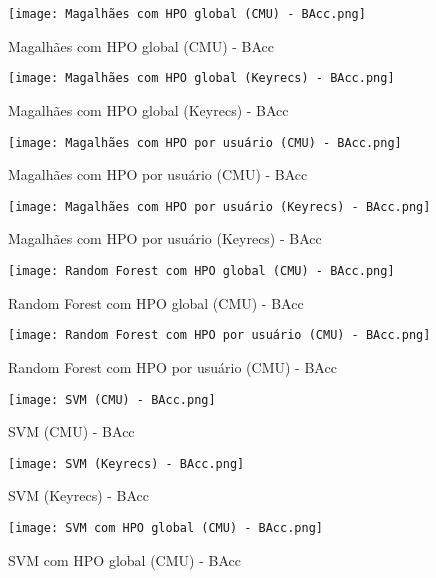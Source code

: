 \begin{figure}[H]
    \caption{Magalhães com HPO global (CMU) - BAcc}\label{fig:Magalhães com HPO global (CMU) - BAcc}
    \centering
    \texttt{[image: Magalhães com HPO global (CMU) - BAcc.png]}
\end{figure}
\begin{figure}[H]
    \caption{Magalhães com HPO global (Keyrecs) - BAcc}\label{fig:Magalhães com HPO global (Keyrecs) - BAcc}
    \centering
    \texttt{[image: Magalhães com HPO global (Keyrecs) - BAcc.png]}
\end{figure}
\begin{figure}[H]
    \caption{Magalhães com HPO por usuário (CMU) - BAcc}\label{fig:Magalhães com HPO por usuário (CMU) - BAcc}
    \centering
    \texttt{[image: Magalhães com HPO por usuário (CMU) - BAcc.png]}
\end{figure}
\begin{figure}[H]
    \caption{Magalhães com HPO por usuário (Keyrecs) - BAcc}\label{fig:Magalhães com HPO por usuário (Keyrecs) - BAcc}
    \centering
    \texttt{[image: Magalhães com HPO por usuário (Keyrecs) - BAcc.png]}
\end{figure}
\begin{figure}[H]
    \caption{Random Forest com HPO global (CMU) - BAcc}\label{fig:Random Forest com HPO global (CMU) - BAcc}
    \centering
    \texttt{[image: Random Forest com HPO global (CMU) - BAcc.png]}
\end{figure}
\begin{figure}[H]
    \caption{Random Forest com HPO por usuário (CMU) - BAcc}\label{fig:Random Forest com HPO por usuário (CMU) - BAcc}
    \centering
    \texttt{[image: Random Forest com HPO por usuário (CMU) - BAcc.png]}
\end{figure}
\begin{figure}[H]
    \caption{SVM (CMU) - BAcc}\label{fig:SVM (CMU) - BAcc}
    \centering
    \texttt{[image: SVM (CMU) - BAcc.png]}
\end{figure}
\begin{figure}[H]
    \caption{SVM (Keyrecs) - BAcc}\label{fig:SVM (Keyrecs) - BAcc}
    \centering
    \texttt{[image: SVM (Keyrecs) - BAcc.png]}
\end{figure}
\begin{figure}[H]
    \caption{SVM com HPO global (CMU) - BAcc}\label{fig:SVM com HPO global (CMU) - BAcc}
    \centering
    \texttt{[image: SVM com HPO global (CMU) - BAcc.png]}
\end{figure}
